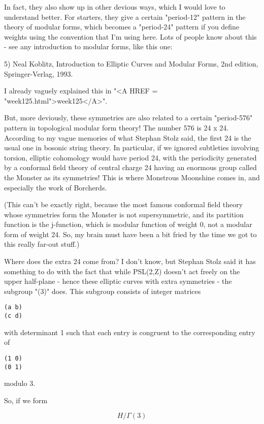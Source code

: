 In fact, they also show up in other devious ways, which I would   
love to understand better.  For starters, they give a certain
"period-12" pattern in the theory of modular forms, which becomes
a "period-24" pattern if you define weights using the convention 
that I'm using here.  Lots of people know about this - see any 
introduction to modular forms, like this one:

5) Neal Koblitz, Introduction to Elliptic Curves and Modular Forms, 
2nd edition, Springer-Verlag, 1993. 

I already vaguely explained this 
in "<A HREF = "week125.html">week125</A>".

But, more deviously, these symmetries are also related to a certain 
"period-576" pattern in topological modular form theory!  The number
576 is 24 x 24.  According to my vague memories of what Stephan Stolz
said, the first 24 is the usual one in bosonic string theory.  In
particular, if we ignored subtleties involving torsion, elliptic 
cohomology would have period 24, with the periodicity generated 
by a conformal field theory of central charge 24 having an enormous
group called the Monster as its symmetries!  This is where Monstrous 
Moonshine comes in, and especially the work of Borcherds.

(This can't be exactly right, because the most famous conformal
field theory whose symmetries form the Monster is not supersymmetric,
and its partition function is the j-function, which is modular
function of weight 0, not a modular form of weight 24.  So, 
my brain must have been a bit fried by the time we got to this
really far-out stuff.) 

Where does the extra 24 come from?  I don't know, but Stephan Stolz 
said it has something to do with the fact that while PSL(2,Z) doesn't 
act freely on the upper half-plane - hence these elliptic curves with 
extra symmetries - the subgroup "\Gamma (3)" does.  This subgroup consists 
of integer matrices

\begin{verbatim}
(a b)
(c d)
\end{verbatim}
    
with determinant 1 such that each entry is congruent to the
corresponding entry of 
\begin{verbatim}
(1 0)
(0 1)
\end{verbatim}
    
modulo 3.

So, if we form

$$
H/\Gamma (3)
$$
    
